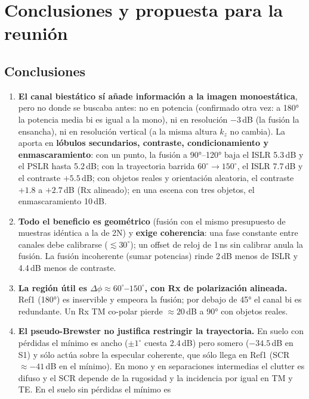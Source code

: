 \chapter{Conclusiones y propuesta para la reunión}
\label{cap:conclusiones}

\section{Conclusiones}
\begin{enumerate}[itemsep=3pt]
  \item \textbf{El canal biestático sí añade información a la imagen monoestática}, pero no
  donde se buscaba antes: no en potencia (confirmado otra vez: a 180° la potencia media bi
  es igual a la mono), ni en resolución $-3$\,dB (la fusión la ensancha), ni en resolución
  vertical (a la misma altura $k_z$ no cambia). La aporta en \textbf{lóbulos secundarios,
  contraste, condicionamiento y enmascaramiento}: con un punto, la fusión a 90°--120° baja
  el ISLR 5.3\,dB y el PSLR hasta 5.2\,dB; con la trayectoria barrida $60^{\circ}\to150^{\circ}$, el ISLR
  7.7\,dB y el contraste $+5.5$\,dB; con objetos reales y orientación aleatoria, el contraste
  $+1.8$ a $+2.7$\,dB (Rx alineado); en una escena con tres objetos, el enmascaramiento
  10\,dB.
  \item \textbf{Todo el beneficio es geométrico} (fusión con el mismo presupuesto de muestras
  idéntica a la de 2N) y \textbf{exige coherencia}: una fase constante entre canales debe
  calibrarse ($\lesssim30^{\circ}$); un offset de reloj de 1\,ns sin calibrar anula la fusión. La
  fusión incoherente (sumar potencias) rinde 2\,dB menos de ISLR y 4.4\,dB menos de contraste.
  \item \textbf{La región útil es $\Delta\phi\approx60^{\circ}$--$150^{\circ}$, con Rx de polarización
  alineada.} Ref1 (180°) es inservible y empeora la fusión; por debajo de 45° el canal bi es
  redundante. Un Rx TM co-polar pierde $\approx20$\,dB a 90° con objetos reales.
  \item \textbf{El pseudo-Brewster no justifica restringir la trayectoria.} En suelo con
  pérdidas el mínimo es ancho ($\pm1^{\circ}$ cuesta 2.4\,dB) pero somero ($-34.5$\,dB en S1) y
  sólo actúa sobre la especular coherente, que sólo llega en Ref1 (SCR $\approx-41$\,dB en el
  mínimo). En mono y en separaciones intermedias el clutter es difuso y el SCR depende de la
  rugosidad y la incidencia por igual en TM y TE. En el suelo sin pérdidas el mínimo es

\end{enumerate}
